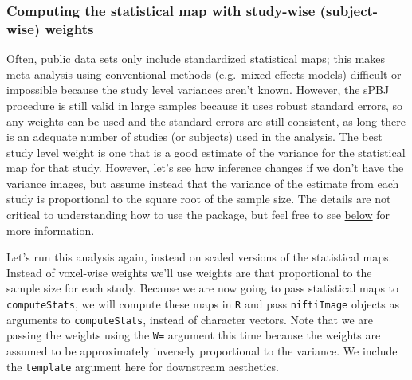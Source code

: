 \documentclass[]{article}
\begin{document}
\subsubsection{Computing the statistical map with study-wise
(subject-wise)
weights}\label{computing-the-statistical-map-with-study-wise-subject-wise-weights}

Often, public data sets only include standardized statistical maps; this
makes meta-analysis using conventional methods (e.g.~mixed effects
models) difficult or impossible because the study level variances aren't
known. However, the sPBJ procedure is still valid in large samples
because it uses robust standard errors, so any weights can be used and
the standard errors are still consistent, as long there is an adequate
number of studies (or subjects) used in the analysis. The best study
level weight is one that is a good estimate of the variance for the
statistical map for that study. However, let's see how inference changes
if we don't have the variance images, but assume instead that the
variance of the estimate from each study is proportional to the square
root of the sample size. The details are not critical to understanding
how to use the package, but feel free to see
\protect\hyperlink{technical_details}{below} for more information.

Let's run this analysis again, instead on scaled versions of the
statistical maps. Instead of voxel-wise weights we'll use weights are
that proportional to the sample size for each study. Because we are now
going to pass statistical maps to \texttt{computeStats}, we will compute
these maps in \texttt{R} and pass \texttt{niftiImage} objects as
arguments to \texttt{computeStats}, instead of character vectors. Note
that we are passing the weights using the \texttt{W=} argument this time
because the weights are assumed to be approximately inversely
proportional to the variance. We include the \texttt{template} argument
here for downstream aesthetics.
\end{document}
